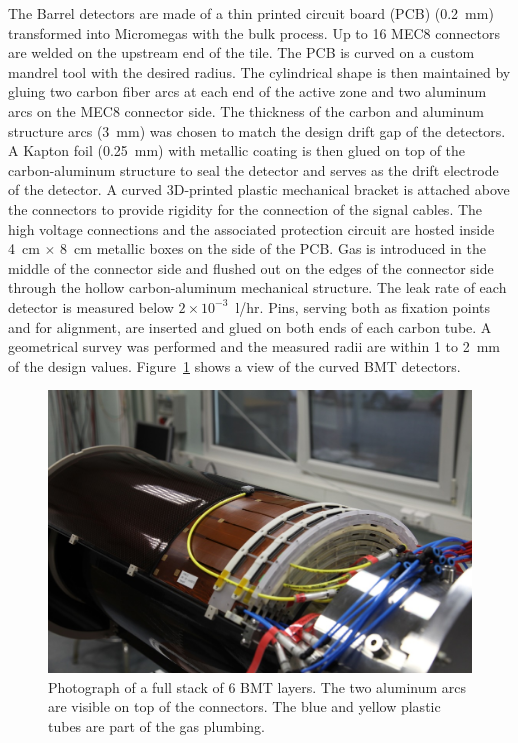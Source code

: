 The Barrel detectors are made of a thin printed circuit board (PCB) (0.2~mm) transformed into Micromegas with the bulk
process. Up to 16 MEC8 connectors are welded on the upstream end of the tile. The PCB is curved on a custom mandrel tool
with the desired radius. The cylindrical shape is then maintained by gluing two carbon fiber arcs at each end of the active
zone and two aluminum arcs on the MEC8 connector side. The thickness of the carbon and aluminum structure arcs (3~mm)
was chosen to match the design drift gap of the detectors. A Kapton foil (0.25~mm) with metallic coating is then glued on top
of the carbon-aluminum structure to seal the detector and serves as the drift electrode of the detector. A curved 3D-printed
plastic mechanical bracket is attached above the connectors to provide rigidity for the connection of the signal cables. The high
voltage connections and the associated protection circuit are hosted inside 4~cm $\times$ 8~cm metallic boxes on the side of
the PCB.  Gas is introduced in the middle of the connector side and flushed out on the edges of the connector side through the
hollow carbon-aluminum mechanical structure. The leak rate of each detector is measured below \(2\times10^{-3}\)~l/hr. Pins,
serving both as fixation points and for alignment, are inserted and glued on both ends of each carbon tube. A geometrical survey
was performed and the measured radii are within 1 to 2~mm of the design values. Figure~\ref{fig:mm-fig4} shows a view of the
curved BMT detectors.

\begin{figure}[htb]
 \includegraphics[width=1.0\columnwidth,keepaspectratio]{images/fig5}
 \caption{Photograph of a full stack of 6 BMT layers. The two aluminum arcs are visible on top of the connectors. The blue and
   yellow plastic tubes are part of the gas plumbing.}
 \label{fig:mm-fig4}
\end{figure}

